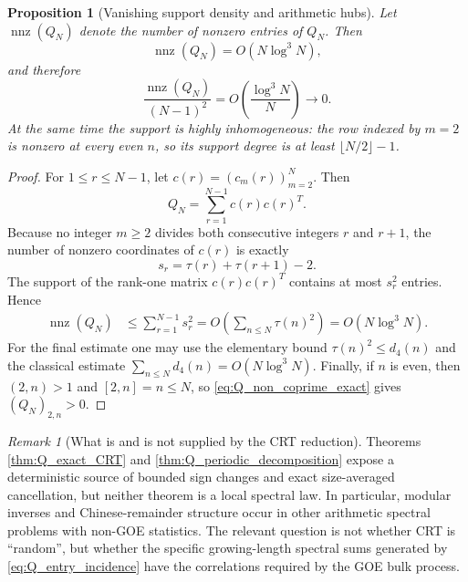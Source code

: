 \documentclass[11pt]{amsart}
\numberwithin{equation}{section}
\theoremstyle{plain}
\newtheorem{proposition}[theorem]{Proposition}
\theoremstyle{definition}
\theoremstyle{remark}
\newtheorem{remark}[theorem]{Remark}
\begin{document}
\begin{proposition}[Vanishing support density and arithmetic hubs]
\label{prop:Q_sparsity}
Let $\operatorname{nnz}(Q_N)$ denote the number of nonzero entries of $Q_N$.  Then
\begin{equation}
\operatorname{nnz}(Q_N)=O(N\log^3N),
\label{eq:Q_nnz_bound}
\end{equation}
and therefore
\begin{equation}
\frac{\operatorname{nnz}(Q_N)}{(N-1)^2}
=O\!\left(\frac{\log^3N}{N}\right)\longrightarrow0.
\label{eq:Q_support_density_zero}
\end{equation}
At the same time the support is highly inhomogeneous: the row indexed by $m=2$ is nonzero at every even $n$, so its support degree is at least $\lfloor N/2\rfloor-1$.
\end{proposition}

\begin{proof}
For $1\le r\le N-1$, let $c(r)=(c_m(r))_{m=2}^N$.  Then
\begin{equation}
Q_N=\sum_{r=1}^{N-1}c(r)c(r)^T.
\label{eq:Q_rank_one_sum}
\end{equation}
Because no integer $m\ge2$ divides both consecutive integers $r$ and $r+1$, the number of nonzero coordinates of $c(r)$ is exactly
\begin{equation}
s_r=\tau(r)+\tau(r+1)-2.
\end{equation}
The support of the rank-one matrix $c(r)c(r)^T$ contains at most $s_r^2$ entries.  Hence
\begin{align}
\operatorname{nnz}(Q_N)
&\le\sum_{r=1}^{N-1}s_r^2
=O\!\left(\sum_{n\le N}\tau(n)^2\right)
=O(N\log^3N).
\end{align}
For the final estimate one may use the elementary bound $\tau(n)^2\le d_4(n)$ and the classical estimate $\sum_{n\le N}d_4(n)=O(N\log^3N)$.  Finally, if $n$ is even, then $(2,n)>1$ and $[2,n]=n\le N$, so \eqref{eq:Q_non_coprime_exact} gives $(Q_N)_{2,n}>0$.
\end{proof}

\begin{remark}[What is and is not supplied by the CRT reduction]
\label{rem:crt_not_goe}
Theorems \ref{thm:Q_exact_CRT} and \ref{thm:Q_periodic_decomposition} expose a deterministic source of bounded sign changes and exact size-averaged cancellation, but neither theorem is a local spectral law.  In particular, modular inverses and Chinese-remainder structure occur in other arithmetic spectral problems with non-GOE statistics.  The relevant question is not whether CRT is ``random'', but whether the specific growing-length spectral sums generated by \eqref{eq:Q_entry_incidence} have the correlations required by the GOE bulk process.
\end{remark}
\end{document}
